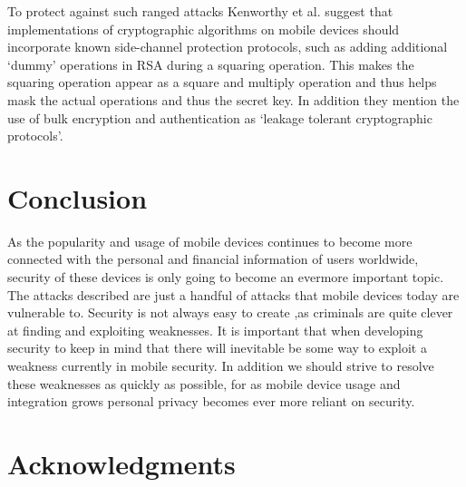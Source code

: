 \documentclass{sig-alternate}
\begin{document}
 To protect against such ranged attacks Kenworthy et al. suggest that implementations of cryptographic algorithms on mobile devices should incorporate known side-channel protection protocols, such as adding additional `dummy' operations in RSA during a squaring operation. This makes the squaring operation appear as a square and multiply operation and thus helps mask the actual operations and thus the secret key. In addition they mention the use of bulk encryption and authentication as `leakage tolerant cryptographic protocols'.      
\section{Conclusion}
As the popularity and usage of mobile devices continues to become more connected with the personal and financial information of users worldwide, security of these devices is only going to become an evermore important topic. The attacks described are just a handful of attacks that mobile devices today are vulnerable to. Security is not always easy to create ,as criminals are quite clever at finding and exploiting weaknesses. It is important that when developing security to keep in mind that there will inevitable be some way to exploit a weakness currently in mobile security. In addition we should strive to resolve these weaknesses as quickly as possible, for as mobile device usage and integration grows personal privacy becomes ever more reliant on security.     

\section{Acknowledgments}
 

\end{document}
